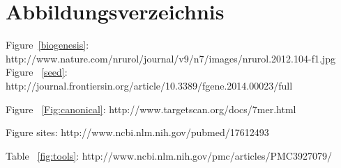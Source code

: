 \documentclass[12pt]{article}
\begin{document}
\newpage



\section{Abbildungsverzeichnis}

Figure~\ref{biogenesis}: \cite{Kelly} http://www.nature.com/nrurol/journal/v9/n7/images/nrurol.2012.104-f1.jpg
Figure ~\ref{seed}: http://journal.frontiersin.org/article/10.3389/fgene.2014.00023/full

Figure ~\ref{Fig:canonical}: http://www.targetscan.org/docs/7mer.html

Figure sites: http://www.ncbi.nlm.nih.gov/pubmed/17612493

Table ~\ref{fig:tools}: http://www.ncbi.nlm.nih.gov/pmc/articles/PMC3927079/
\end{document}
